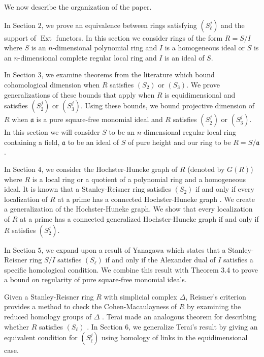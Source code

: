 \documentclass[11pt]{amsart}
\numberwithin{equation}{section}
\theoremstyle{definition}
\theoremstyle{remark}
\newcommand{\Ext}{\operatorname{Ext}}
\begin{document}
We now describe the organization of the paper.

In Section $2$, we prove an equivalence between rings satisfying $(S_{\ell}^j)$ and the support of $\Ext$ functors.  In this section we consider rings of the form $R=S/I$ where $S$ is an $n$-dimensional polynomial ring and $I$ is a homogeneous ideal or $S$ is an $n$-dimensional complete regular local ring and $I$ is an ideal of $S$.

In Section $3$, we examine theorems from the literature which bound cohomological dimension when $R$ satisfies $(S_2)$ or $(S_3)$. We prove generalizations of these bounds that apply when $R$ is equidimensional and satisfies $(S_2^j)$ or $(S_3^j)$. Using these bounds, we bound projective dimension of $R$ when $\mathfrak{a}$ is a pure square-free monomial ideal and $R$ satisfies $(S_2^j)$ or $(S_3^j)$.  In this section we will consider $S$ to be an $n$-dimensional regular local ring containing a field, $\mathfrak{a}$ to be an ideal of $S$ of pure height and our ring to be $R=S/\mathfrak{a}$.

In Section $4$, we consider the Hochster-Huneke graph of $R$ (denoted by $G(R)$) where $R$ is a local ring or a quotient of a polynomial ring and a homogeneous ideal.  It is known that a Stanley-Reisner ring satisfies $(S_2)$ if and only if every localization of $R$ at a prime has a connected Hochster-Huneke graph \cite{Ku08, Ho16}.  We create a generalization of the Hochster-Huneke graph. We show that every localization of $R$ at a prime has a connected generalized Hochster-Huneke graph if and only if $R$ satisfies $(S_2^j)$.

In Section $5$, we expand upon a result of Yanagawa \cite{Ya00} which states that a Stanley-Reisner ring $S/I$ satisfies $(S_{\ell})$ if and only if the Alexander dual of $I$ satisfies a specific homological condition.  We combine this result with Theorem 3.4 to prove a bound on regularity of pure square-free monomial ideals.

Given a Stanley-Reisner ring $R$ with simplicial complex $\Delta$, Reisner's criterion provides a method to check the Cohen-Macaulayness of $R$ by examining the reduced homology groups of $\Delta$ \cite{Re76}. Terai made an analogous theorem for describing whether $R$ satisfies $(S_\ell)$ \cite{Te07}. In Section $6$, we generalize Terai's result by giving an equivalent condition for $(S_\ell^j)$ using homology of links in the equidimensional case.
\end{document}
